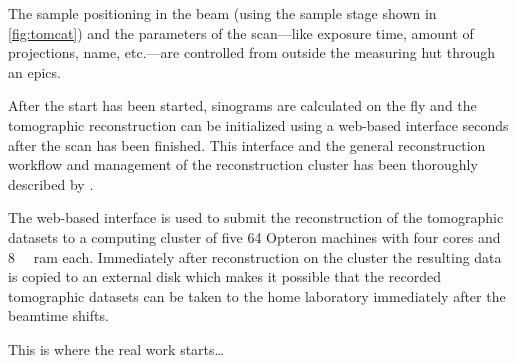 The sample positioning in the beam (using the sample stage shown in \autoref{fig:tomcat}) and the parameters of the scan---like exposure time, amount of projections, name, etc.---are controlled from outside the measuring hut through an \ac{epics}.

After the start has been started, sinograms are calculated on the fly and the tomographic reconstruction can be initialized using a web-based interface seconds after the scan has been finished. This interface and the general reconstruction workflow and management of the reconstruction cluster has been thoroughly described by \citet{Hintermueller2010}.

The web-based interface is used to submit the reconstruction of the tomographic datasets to a computing cluster of five \SI{64}{\bit} Opteron machines with four cores and \SI{8}{\giga\byte} \acs{ram} each. Immediately after reconstruction on the cluster the resulting data is copied to an external disk which makes it possible that the recorded tomographic datasets can be taken to the home laboratory immediately after the beamtime shifts.

This is where the real work starts\ldots